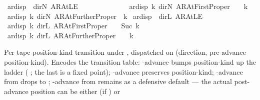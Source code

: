 \begin{isabellebody}
{\isacharbar}{\kern0pt}\ {\isachardoublequoteopen}ar{\isacharunderscore}{\kern0pt}disp\ {\isacharunderscore}{\kern0pt}\ dir{\isachardot}{\kern0pt}N\ AR{\isacharunderscore}{\kern0pt}AtLE\ \ \ \ \ \ \ \ \ \ \ \ {\isacharequal}{\kern0pt}\ {}{\isachardoublequoteclose}\isanewline
{\isacharbar}{\kern0pt}\ {\isachardoublequoteopen}ar{\isacharunderscore}{\kern0pt}disp\ k\ dir{\isachardot}{\kern0pt}N\ AR{\isacharunderscore}{\kern0pt}AtFirstProper\ \ \ {\isacharequal}{\kern0pt}\ k{\isachardoublequoteclose}\isanewline
{\isacharbar}{\kern0pt}\ {\isachardoublequoteopen}ar{\isacharunderscore}{\kern0pt}disp\ k\ dir{\isachardot}{\kern0pt}N\ AR{\isacharunderscore}{\kern0pt}AtFurtherProper\ {\isacharequal}{\kern0pt}\ k{\isachardoublequoteclose}\isanewline
{\isacharbar}{\kern0pt}\ {\isachardoublequoteopen}ar{\isacharunderscore}{\kern0pt}disp\ {\isacharunderscore}{\kern0pt}\ dir{\isachardot}{\kern0pt}L\ AR{\isacharunderscore}{\kern0pt}AtLE\ \ \ \ \ \ \ \ \ \ \ \ {\isacharequal}{\kern0pt}\ {}{\isachardoublequoteclose}\isanewline
{\isacharbar}{\kern0pt}\ {\isachardoublequoteopen}ar{\isacharunderscore}{\kern0pt}disp\ k\ dir{\isachardot}{\kern0pt}L\ AR{\isacharunderscore}{\kern0pt}AtFirstProper\ \ \ {\isacharequal}{\kern0pt}\ Suc\ k{\isachardoublequoteclose}\isanewline
{\isacharbar}{\kern0pt}\ {\isachardoublequoteopen}ar{\isacharunderscore}{\kern0pt}disp\ k\ dir{\isachardot}{\kern0pt}L\ AR{\isacharunderscore}{\kern0pt}AtFurtherProper\ {\isacharequal}{\kern0pt}\ {}\ {\isacharasterisk}{\kern0pt}\ k{\isachardoublequoteclose}%
\begin{isamarkuptext}%
Per-tape position-kind transition under
  , dispatched on (direction,
  pre-advance position-kind).  Encodes the transition table:
  -advance bumps position-kind up the
  ladder ( \isa{{\isasymrightarrow}}
   \isa{{\isasymrightarrow}}
  ; the last is a fixed point);
  -advance preserves position-kind;
  -advance from 
  drops to ; -advance from
   remains
   as a defensive default — the
  actual post-advance position can be either
   (if ) or

\end{isamarkuptext}
\end{isabellebody}
